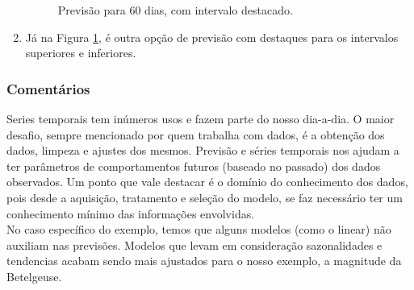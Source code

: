 \documentclass[a4paper,12pt]{article}
\begin{document}
\begin{enumerate}
\begin{figure}[h!tb]
             \caption{Previsão para 60 dias, com intervalo destacado.}
             \label{fig205}
        \end{figure}
     \item Já na Figura \ref{fig205}, é outra opção de previsão com destaques para os intervalos superiores e inferiores.
\end{enumerate}

\subsubsection{Comentários}

Series temporais tem inúmeros usos e fazem parte do nosso dia-a-dia. O maior desafio, sempre mencionado por quem trabalha com dados, é a obtenção dos dados, limpeza e ajustes dos mesmos. Previsão e séries temporais nos ajudam a ter parâmetros de comportamentos futuros (baseado no passado) dos dados observados. Um ponto que vale destacar é o domínio do conhecimento dos dados, pois desde a aquisição, tratamento e seleção do modelo, se faz necessário ter um conhecimento mínimo das informações envolvidas.\\
No caso específico do exemplo, temos que alguns modelos (como o linear) não auxiliam nas previsões. Modelos que levam em consideração sazonalidades e tendencias acabam sendo mais ajustados para o nosso exemplo, a magnitude da Betelgeuse.  
\end{document}
